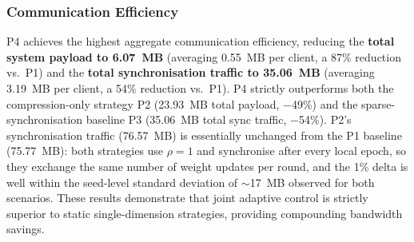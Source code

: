 \documentclass[conference]{IEEEtran}
\begin{document}
\subsubsection{Communication Efficiency}
P4 achieves the highest aggregate communication efficiency, reducing the \textbf{total system payload to 6.07~MB} (averaging 0.55~MB per client, a 87\% reduction vs.~P1) and the \textbf{total synchronisation traffic to 35.06~MB} (averaging 3.19~MB per client, a 54\% reduction vs.~P1). P4 strictly outperforms both the compression-only strategy P2 (23.93~MB total payload, $-$49\%) and the sparse-synchronisation baseline P3 (35.06~MB total sync traffic, $-$54\%). P2's synchronisation traffic (76.57~MB) is essentially unchanged from the P1 baseline (75.77~MB): both strategies use $\rho{=}1$ and synchronise after every local epoch, so they exchange the same number of weight updates per round, and the 1\% delta is well within the seed-level standard deviation of $\sim$17~MB observed for both scenarios. These results demonstrate that joint adaptive control is strictly superior to static single-dimension strategies, providing compounding bandwidth savings.
\end{document}
